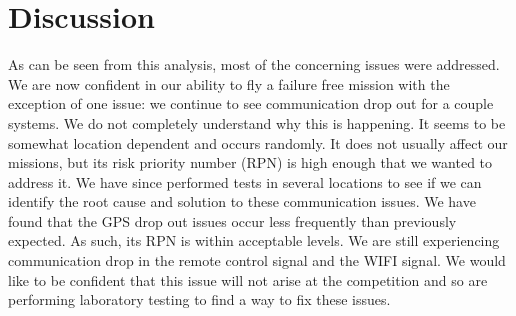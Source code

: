 \documentclass[]{auvsi_doc}
\begin{document}
\section{Discussion}
As can be seen from this analysis, most of the concerning issues were addressed. We are now confident in our ability to fly a failure free mission with the exception of one issue: we continue to see communication drop out for a couple systems. We do not completely understand why this is happening. It seems to be somewhat location dependent and occurs randomly. It does not usually affect our missions, but its risk priority number (RPN) is high enough that we wanted to address it. We have since performed tests in several locations to see if we can identify the root cause and solution to these communication issues. We have found that the GPS drop out issues occur less frequently than previously expected. As such, its RPN is within acceptable levels. We are still experiencing communication drop in the remote control signal and the WIFI signal. We would like to be confident that this issue will not arise at the competition and so are performing laboratory testing to find a way to fix these issues.
\end{document}
